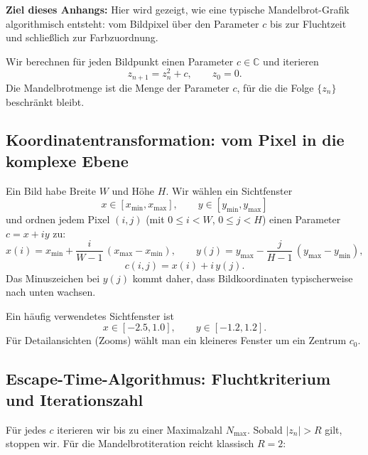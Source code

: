 
\textbf{Ziel dieses Anhangs:} Hier wird gezeigt, wie eine typische Mandelbrot-Grafik algorithmisch entsteht:
vom Bildpixel über den Parameter \(c\) bis zur Fluchtzeit und schließlich zur Farbzuordnung.

\begin{MathBox}
		\label{box:mandelbrot-grundprinzip}
	Wir berechnen für jeden Bildpunkt einen Parameter \(c\in\mathbb{C}\) und iterieren
	\[
	z_{n+1}=z_n^2+c,\qquad z_0=0.
	\]
	Die Mandelbrotmenge ist die Menge der Parameter \(c\), für die die Folge \(\{z_n\}\) beschränkt bleibt.
\end{MathBox}

\subsection{Koordinatentransformation: vom Pixel in die komplexe Ebene}

Ein Bild habe Breite \(W\) und Höhe \(H\). Wir wählen ein Sichtfenster
\[
x\in[x_{\min},x_{\max}],\qquad y\in[y_{\min},y_{\max}]
\]
und ordnen jedem Pixel \((i,j)\) (mit \(0\le i<W\), \(0\le j<H\)) einen Parameter \(c=x+iy\) zu:
\[
x(i)=x_{\min}+\frac{i}{W-1}\,(x_{\max}-x_{\min}),\qquad
y(j)=y_{\max}-\frac{j}{H-1}\,(y_{\max}-y_{\min}),
\]
\[
c(i,j)=x(i)+i\,y(j).
\]
Das Minuszeichen bei \(y(j)\) kommt daher, dass Bildkoordinaten typischerweise nach unten wachsen.

\begin{NoteBox}
	\label{box:mandelbrot-standardfenster}
	Ein häufig verwendetes Sichtfenster ist
	\[
	x\in[-2.5,1.0],\qquad y\in[-1.2,1.2].
	\]
	Für Detailansichten (Zooms) wählt man ein kleineres Fenster um ein Zentrum \(c_0\).
\end{NoteBox}

\subsection{Escape-Time-Algorithmus: Fluchtkriterium und Iterationszahl}

Für jedes \(c\) iterieren wir bis zu einer Maximalzahl \(N_{\max}\). Sobald \(|z_n|>R\) gilt, stoppen wir.
Für die Mandelbrotiteration reicht klassisch \(R=2\):

